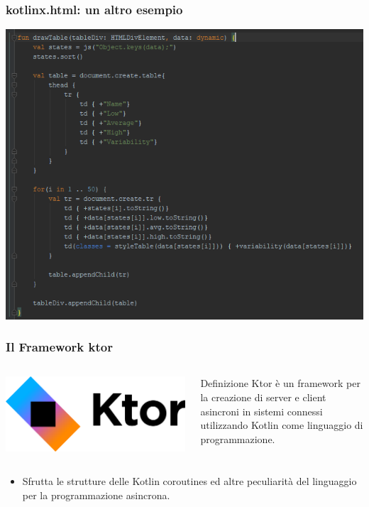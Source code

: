     \begin{frame}
      \frametitle{\textbf{kotlinx.html}: un altro esempio}
      \begin{center}
        \includegraphics[scale=0.5]{HtmlXCreateTable}
      \end{center}
    \end{frame}

    \begin{frame}
      \frametitle{Il Framework \textbf{ktor}}
      \begin{columns}
        \begin{column}{0.47\textwidth}
          \includegraphics[scale=0.2]{Ktor}
        \end{column}
        \begin{column}{0.5\textwidth}
          \begin{block}{Definizione}
            Ktor è un framework per la creazione di server e client asincroni in sistemi connessi utilizzando Kotlin come linguaggio di programmazione.
          \end{block}
        \end{column}
      \end{columns}
      \bigskip
      \begin{itemize}
        \item Sfrutta le strutture delle \alert{Kotlin coroutines} ed altre peculiarità del linguaggio per la programmazione asincrona.
      \end{itemize}
    \end{frame}


